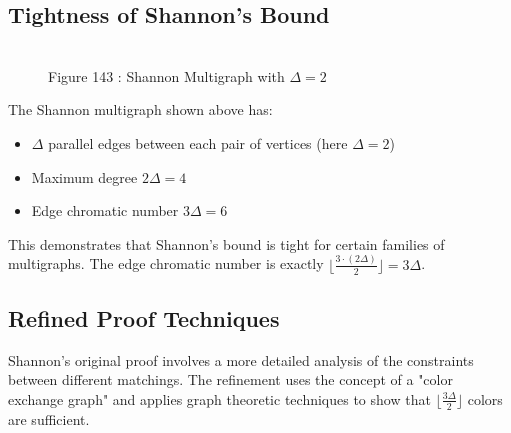 \documentclass{article}
\theoremstyle{definition}
\begin{document}
\subsection*{Tightness of Shannon's Bound}

\begin{figure}[ht]
\centering
{}
\\
\small Figure 143 : {Shannon Multigraph with $\Delta = 2$}
\end{figure}

The Shannon multigraph shown above has:
\begin{itemize}
    \item $\Delta$ parallel edges between each pair of vertices (here $\Delta = 2$)
    \item Maximum degree $2\Delta = 4$
    \item Edge chromatic number $3\Delta = 6$
\end{itemize}

This demonstrates that Shannon's bound is tight for certain families of multigraphs. The edge chromatic number is exactly $\lfloor \frac{3 \cdot (2\Delta)}{2} \rfloor = 3\Delta$.

\subsection*{Refined Proof Techniques}

Shannon's original proof involves a more detailed analysis of the constraints between different matchings. The refinement uses the concept of a "color exchange graph" and applies graph theoretic techniques to show that $\lfloor \frac{3\Delta}{2} \rfloor$ colors are sufficient.
\end{document}
